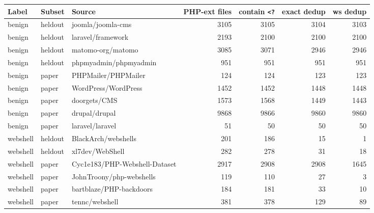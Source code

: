 \begin{tabular}{@{}lllrrrr@{}}
\toprule
Label & Subset & Source & PHP-ext files & contain \texttt{<?} & exact dedup & ws dedup \\ \midrule
benign & heldout & joomla/joomla-cms & 3105 & 3105 & 3104 & 3103 \\
benign & heldout & laravel/framework & 2193 & 2100 & 2100 & 2100 \\
benign & heldout & matomo-org/matomo & 3085 & 3071 & 2946 & 2946 \\
benign & heldout & phpmyadmin/phpmyadmin & 951 & 951 & 951 & 951 \\
benign & paper & PHPMailer/PHPMailer & 124 & 124 & 123 & 123 \\
benign & paper & WordPress/WordPress & 1452 & 1452 & 1448 & 1448 \\
benign & paper & doorgets/CMS & 1573 & 1568 & 1449 & 1443 \\
benign & paper & drupal/drupal & 9868 & 9866 & 9860 & 9860 \\
benign & paper & laravel/laravel & 51 & 50 & 50 & 50 \\
webshell & heldout & BlackArch/webshells & 201 & 186 & 15 & 1 \\
webshell & heldout & xl7dev/WebShell & 282 & 278 & 31 & 18 \\
webshell & paper & Cyc1e183/PHP-Webshell-Dataset & 2917 & 2908 & 2908 & 1645 \\
webshell & paper & JohnTroony/php-webshells & 119 & 110 & 27 & 3 \\
webshell & paper & bartblaze/PHP-backdoors & 184 & 181 & 33 & 10 \\
webshell & paper & tennc/webshell & 381 & 378 & 129 & 89 \\
\bottomrule
\end{tabular}
